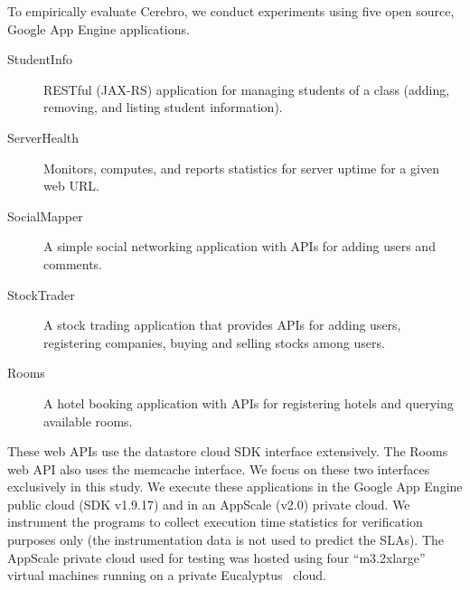 To empirically evaluate Cerebro, we conduct experiments using five open source, Google
App Engine applications.

\begin{description}
\item[StudentInfo] RESTful (JAX-RS) application for managing
students of a class (adding, removing, and listing student information).
\item[ServerHealth] Monitors, computes, and reports statistics for server
uptime for a given web URL.
\item[SocialMapper] A simple social networking application with APIs for
adding users and comments.
\item[StockTrader] A stock trading application that
provides APIs for adding users, registering companies, buying and selling
stocks among users. 
\item[Rooms] A hotel booking application with APIs
for registering hotels and querying available rooms.
\end{description}

These web APIs use the datastore
cloud SDK interface extensively. The Rooms web API also uses the
memcache interface. We focus on these two interfaces exclusively in this
study. We execute these applications in the Google App Engine public cloud 
(SDK v1.9.17)
and in an AppScale (v2.0) private cloud.  We instrument the programs to collect
execution time statistics for verification purposes only 
(the instrumentation data is not used to predict
the SLAs).  The AppScale private cloud used for testing was
hosted using four ``m3.2xlarge'' virtual machines running on a private
Eucalyptus~\cite{eucalyptus09} cloud.



